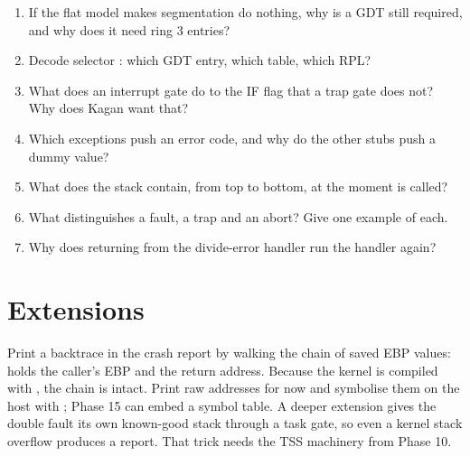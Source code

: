 \documentclass[11pt,a4paper]{article}
\begin{document}
\begin{questionbox}
\begin{enumerate}
  \item If the flat model makes segmentation do nothing, why is a GDT still required, and why does it need ring 3 entries?
  \item Decode selector : which GDT entry, which table, which RPL?
  \item What does an interrupt gate do to the IF flag that a trap gate does not? Why does Kagan want that?
  \item Which exceptions push an error code, and why do the other stubs push a dummy value?
  \item What does the stack contain, from top to bottom, at the moment  is called?
  \item What distinguishes a fault, a trap and an abort? Give one example of each.
  \item Why does returning from the divide-error handler run the handler again?
\end{enumerate}
\end{questionbox}

\section{Extensions}

Print a backtrace in the crash report by walking the chain of saved EBP values: \code{[ebp]} holds the caller's EBP and
\code{[ebp+4]} the return address. Because the kernel is compiled with , the chain is intact. Print
raw addresses for now and symbolise them on the host with ; Phase 15 can embed a symbol table.
A deeper extension gives the double fault its own known-good stack through a task gate, so even a kernel stack
overflow produces a report. That trick needs the TSS machinery from Phase 10.

\booklegend
\end{document}
